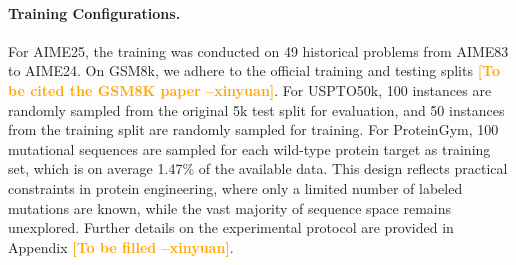 \documentclass{article}
\newcommand{\method}{Forward Learning}
\newcommand{\xinyuan}[1]{\textcolor{orange}{\bf \small [#1 --xinyuan]}}
\begin{document}
\paragraph{Training Configurations.}%
For AIME25, the training was conducted on 49 historical problems from AIME83 to AIME24. On GSM8k, we adhere to the official training and testing splits \xinyuan{To be cited the GSM8K paper}. For USPTO50k, 100 instances are randomly sampled from the original 5k test split for evaluation, and 50 instances from the training split are randomly sampled for training. For ProteinGym, 100 mutational sequences are sampled for each wild-type protein target as training set, which is on average 1.47\% of the available data. This design reflects practical constraints in protein engineering, where only a limited number of labeled mutations are known, while the vast majority of sequence space remains unexplored. Further details on the experimental protocol are provided in Appendix \xinyuan{To be filled}.



\end{document}
